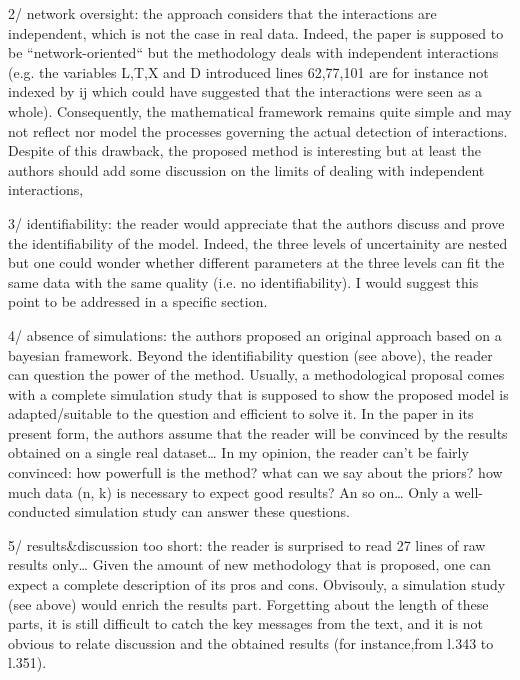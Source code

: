 2/ network oversight: the approach considers that the interactions are independent, which is not the case in real data. Indeed, the paper is supposed to be “network-oriented“ but the methodology deals with independent interactions (e.g. the variables L,T,X and D introduced lines 62,77,101 are for instance not indexed by ij which could have suggested that the interactions were seen as a whole). Consequently, the mathematical framework remains quite simple and may not reflect nor model the processes governing the actual detection of interactions. Despite of this drawback, the proposed method is interesting but at least the authors should add some discussion on the limits of dealing with independent interactions,

3/ identifiability: the reader would appreciate that the authors discuss and prove the identifiability of the model. Indeed, the three levels of uncertainity are nested but one could wonder whether different parameters at the three levels can fit the same data with the same quality (i.e. no identifiability).  I would suggest this point to be addressed in a specific section.

4/ absence of simulations: the authors proposed an original approach based on a bayesian framework. Beyond the identifiability question (see above), the reader can question the power of the method. Usually, a methodological proposal comes with a complete simulation study that is supposed to show  the proposed model is adapted/suitable to the question and efficient to solve it. In the paper in its present form, the authors assume that the reader will be convinced by the results obtained on a single real dataset… In my opinion, the reader can’t be fairly convinced: how powerfull is the method? what can we say about the priors? how much data (n, k) is necessary to expect good results? An so on… Only a well-conducted simulation study can answer these questions.

5/ results&discussion too short: the reader is surprised to read 27 lines of raw results only… Given the amount of new methodology that is proposed, one can expect a complete description of its pros and cons. Obvisouly, a simulation study (see above) would enrich the results part. Forgetting about the length of these parts, it is still difficult to catch the key messages from the text, and it is not obvious to relate discussion and the obtained results (for instance,from l.343 to l.351).

